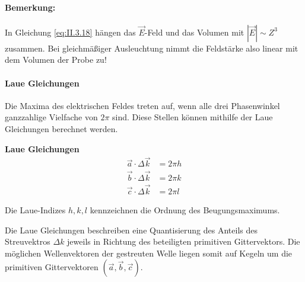\paragraph{Bemerkung:}
	In Gleichung \eqref{eq:II.3.18} hängen das $\vec E$-Feld und das Volumen mit $| \Vec{E}| \sim Z^3$ zusammen. 
	Bei gleichmäßiger Ausleuchtung nimmt die Feldstärke also linear mit dem Volumen der Probe zu!

\paragraph{Laue Gleichungen}
	Die Maxima des elektrischen Feldes treten auf, wenn alle drei Phasenwinkel ganzzahlige Vielfache von $2\pi$ sind.
	Diese Stellen können mithilfe der Laue Gleichungen berechnet werden.
	\begin{important}
		\textbf{Laue Gleichungen}
		\begin{equation}
			\label{eq:II.3.19}
			\begin{split}
				\Vec{a} \cdot \Delta \Vec{k} &= 2 \pi h \\
				\Vec{b} \cdot \Delta \Vec{k} &= 2 \pi k \\
				\Vec{c} \cdot \Delta \Vec{k} &= 2 \pi l
			\end{split}
		\end{equation} 
	\end{important}
	Die Laue-Indizes $h,k,l$ kennzeichnen die Ordnung des Beugungsmaximums.\\
	
	\begin{minipage}{0.6\linewidth}
		Die Laue Gleichungen beschreiben eine Quantisierung des Anteils des Streuvektros $\Delta k $ jeweils in Richtung des beteiligten primitiven Gittervektors.
		Die möglichen Wellenvektoren der gestreuten Welle liegen somit auf Kegeln um die primitiven Gittervektoren $(\Vec{a}, \Vec{b}, \Vec{c})$.
	\end{minipage}
	\hfill
	\begin{minipage}{0.3\linewidth}
		\centering
		\label{fig:vl16_abbildung_3}
	\end{minipage}

